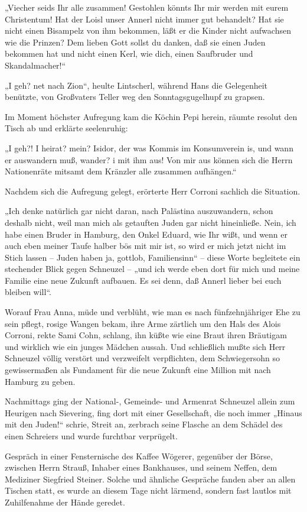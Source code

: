 „Viecher seids Ihr alle zusammen! Gestohlen könnts Ihr mir werden
mit eurem Christentum! Hat der Loisl unser Annerl nicht immer gut
behandelt? Hat sie nicht einen Bisampelz von ihm bekommen, läßt er
die Kinder nicht aufwachsen wie die Prinzen? Dem lieben Gott sollst
du danken, daß sie einen Juden bekommen hat und nicht einen Kerl,
wie dich, einen Saufbruder und Skandalmacher!“

„I geh? net nach Zion“, heulte Lintscherl, während
Hans die Gelegenheit benützte, von Großvaters Teller weg den
Sonntagsgugelhupf zu grapsen.

Im Moment höchster Aufregung kam die Köchin Pepi herein, räumte
resolut den Tisch ab und erklärte seelenruhig:

„I geh?! I heirat? mein? Isidor, der was Kommis im Konsumverein is,
und wann er auswandern muß, wander? i mit ihm aus! Von mir aus
können sich die Herrn Nationenräte mitsamt dem Kränzler alle
zusammen aufhängen.“

Nachdem sich die Aufregung gelegt, erörterte Herr Corroni sachlich
die Situation.

„Ich denke natürlich gar nicht daran, nach Palästina auszuwandern,
schon deshalb nicht, weil man mich als getauften Juden gar nicht
hineinließe. Nein, ich habe einen Bruder in Hamburg, den Onkel
Eduard, wie Ihr wißt, und wenn er auch eben meiner Taufe halber bös
mit mir ist, so wird er mich jetzt nicht im Stich lassen – Juden
haben ja, gottlob, Familiensinn“ – diese Worte begleitete ein
stechender Blick gegen Schneuzel – „und ich werde eben dort für
mich und meine Familie eine neue Zukunft aufbauen. Es sei denn, daß
Annerl lieber bei euch bleiben will“.

Worauf Frau Anna, müde und verblüht, wie man es nach
fünfzehnjähriger Ehe zu sein pflegt, rosige Wangen bekam, ihre Arme
zärtlich um den Hals des Alois Corroni, rekte Sami Cohn, schlang,
ihn küßte wie eine Braut ihren Bräutigam und wirklich wie ein
junges Mädchen  aussah. Und schließlich mußte sich
Herr Schneuzel völlig verstört und verzweifelt verpflichten, dem
Schwiegersohn so gewissermaßen als Fundament für die neue Zukunft
eine Million mit nach Hamburg zu geben.

Nachmittags ging der National-, Gemeinde- und Armenrat Schneuzel
allein zum Heurigen nach Sievering, fing dort mit einer
Gesellschaft, die noch immer „Hinaus mit den Juden!“ schrie, Streit
an, zerbrach seine Flasche an dem Schädel des einen Schreiers und
wurde furchtbar verprügelt.

\tb{* * *}
Gespräch in einer Fensternische des Kaffee Wögerer, gegenüber der
Börse, zwischen Herrn Strauß, Inhaber eines Bankhauses, und seinem
Neffen, dem Mediziner Siegfried Steiner. Solche und ähnliche
Gespräche fanden aber an allen Tischen statt, es wurde an diesem
Tage nicht lärmend, sondern fast lautlos mit Zuhilfenahme der Hände
geredet.

